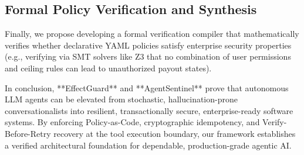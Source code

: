 \subsection{Formal Policy Verification and Synthesis}
Finally, we propose developing a formal verification compiler that mathematically verifies whether declarative YAML policies satisfy enterprise security properties (e.g., verifying via SMT solvers like Z3 that no combination of user permissions and ceiling rules can lead to unauthorized payout states).

\vspace{1cm}
In conclusion, **EffectGuard** and **AgentSentinel** prove that autonomous LLM agents can be elevated from stochastic, hallucination-prone conversationalists into resilient, transactionally secure, enterprise-ready software systems. By enforcing Policy-as-Code, cryptographic idempotency, and Verify-Before-Retry recovery at the tool execution boundary, our framework establishes a verified architectural foundation for dependable, production-grade agentic AI.
